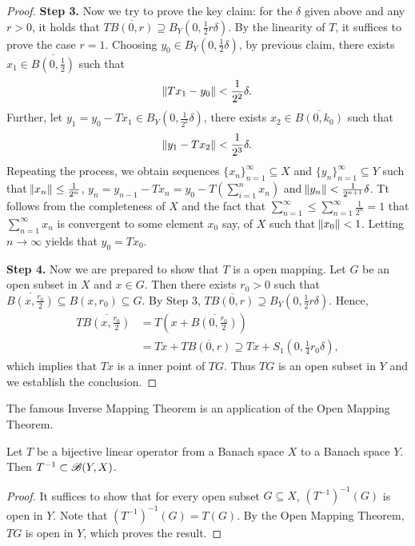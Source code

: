\begin{proof}
\textbf{Step 3. }
Now we try to prove the key claim: for the $\delta$ given above and 
any $r > 0$, it holds that $T \overline{B(0, r)} \supseteq B_Y(0, 
\frac{1}{2} r \delta)$. 
By the linearity of $T$, it suffices to prove the case $r = 1$. 
Choosing $y_0 \in B_Y(0, \frac{1}{2} \delta)$, by previous claim, there 
exists $x_1 \in \overline{B(0, \frac{1}{2})}$ such that 
\begin{equation*}
    \norm{T x_1 - y_0}< \frac{1}{2^2} \delta. 
\end{equation*}
Further, let $y_1 = y_0 - Tx_1 \in B_Y(0, \frac{1}{2^2} \delta)$, 
there exists $x_2 \in \overline{B(0, k_0)}$ such that 
\begin{equation*}
    \norm{y_1 - T x_2} < \frac{1}{2^3} \delta. 
\end{equation*}
Repeating the process, we obtain sequences $\{ x_n \}_{n=1}^{\infty} 
\subseteq X$ and $\{ y_n \}_{n=1}^{\infty} \subseteq Y$ such that 
$\norm{x_n} \le \frac{1}{2^n}$, $y_n = y_{n-1} - Tx_n = y_0 - 
T\left( \sum_{i=1}^{n} x_n \right)$ and $\norm{y_n} < \frac{1}{2^{n+1}} 
\delta$. 
Tt follows from the completeness of $X$ and the fact that $\sum_{n=1}^
{\infty} \le \sum_{n=1}^{\infty} \frac{1}{2^n} = 1$ that $\sum_{n=1}^{\infty} 
x_n$ is convergent to some element $x_0$ say, of $X$ such that $\norm{x_0} 
< 1$. 
Letting $n \to \infty$ yields that $y_0 = Tx_0$. 

\textbf{Step 4. }
Now we are prepared to show that $T$ is a open mapping. 
Let $G$ be an open subset in $X$ and $x \in G$. 
Then there exists $r_0 > 0$ such that $\overline{B(x, \frac{r_0}{2})} 
\subseteq B(x, r_0) \subseteq G$. 
By Step 3, $T \overline{B(0, r)} \supseteq B_Y(0, \frac{1}{2}r \delta)$. 
Hence, 
\begin{equation*}
    \begin{aligned}
        T \overline{B(x, \frac{r_0}{2})} 
        &= T\left( x + \overline{B(0, \frac{r_0}{2})} \right) \\
        &= Tx + T \overline{B(0, r)} 
        \supseteq Tx + S_1(0, \frac{1}{4} r_0 \delta), 
    \end{aligned}
\end{equation*}
which implies that $Tx$ is a inner point of $TG$. 
Thus $TG$ is an open subset in $Y$ and we establish the conclusion. 
\end{proof}

The famous Inverse Mapping Theorem is an application of the Open Mapping 
Theorem. 
\begin{thm}
Let $T$ be a bijective linear operator from a Banach space $X$ to a Banach 
space $Y$. 
Then $T^{-1} \subset \mathscr{B}(Y, X)$. 
\end{thm}
\begin{proof}
It suffices to show that for every open subset $G \subseteq X$, 
$\left( T^{-1} \right) ^{-1}(G)$ is open in $Y$. 
Note that $\left( T^{-1} \right) ^{-1}(G) = T(G)$. 
By the Open Mapping Theorem, $TG$ is open in $Y$, which proves the result. 
\end{proof}

